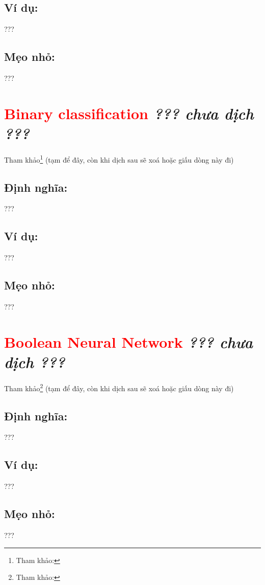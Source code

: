\subsection*{Ví dụ:}
???
\subsection*{Mẹo nhỏ:}
???
\section*{\huge \textcolor{Red}{Binary classification}  \small \textit{??? chưa dịch ???} }
Tham khảo\footnote{Tham khảo:} (tạm để đây, còn khi dịch sau sẽ xoá hoặc giấu dòng này đi)
\subsection*{Định nghĩa:}
???
\subsection*{Ví dụ:}
???
\subsection*{Mẹo nhỏ:}
???
\section*{\huge \textcolor{Red}{Boolean Neural Network}  \small \textit{??? chưa dịch ???} }
Tham khảo\footnote{Tham khảo:} (tạm để đây, còn khi dịch sau sẽ xoá hoặc giấu dòng này đi)
\subsection*{Định nghĩa:}
???
\subsection*{Ví dụ:}
???
\subsection*{Mẹo nhỏ:}
???

